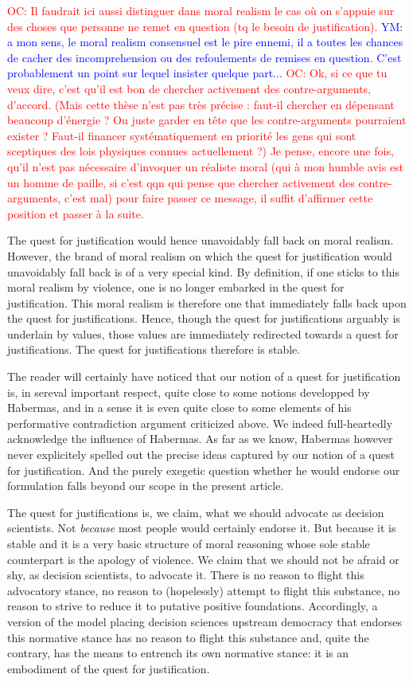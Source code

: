 \documentclass[preprint, french, english, 11pt]{elsarticle}%
\newcommand{\commentYM}[1]{\textcolor{blue}{YM: #1}}
\newcommand{\commentOC}[1]{\textcolor{red}{OC: #1}}
\begin{document}
\commentOC{Il faudrait ici aussi distinguer
dans moral realism le cas où on s’appuie sur des choses que
personne ne remet en question (tq le besoin de
justification).}
\commentYM{a mon sens, le moral realism consensuel est le pire ennemi, il a toutes les chances de cacher des incomprehension ou des refoulements de remises en question. C'est probablement un point sur lequel insister quelque part...}
\commentOC{Ok, si ce que tu veux dire, c’est qu’il est bon de chercher activement des contre-arguments, d’accord. (Mais cette thèse n’est pas très précise : faut-il chercher en dépensant beaucoup d’énergie ? Ou juste garder en tête que les contre-arguments pourraient exister ? Faut-il financer systématiquement en priorité les gens qui sont sceptiques des lois physiques connues actuellement ?) Je pense, encore une fois, qu’il n’est pas nécessaire d’invoquer un réaliste moral (qui à mon humble avis est un homme de paille, si c’est qqn qui pense que chercher activement des contre-arguments, c’est mal) pour faire passer ce message, il suffit d’affirmer cette position et passer à la suite.}

The quest for justification would hence unavoidably fall back on moral realism. However, the brand of moral realism on which the quest for justification would unavoidably fall back is of a very special kind. By definition, if one sticks to this moral realism by violence, one is no longer embarked in the quest for justification. This moral realism is therefore one that immediately falls back upon the quest for justifications. Hence, though the quest for justifications arguably is underlain by values, those values are immediately redirected towards a quest for justifications. The quest for justifications therefore is stable.

The reader will certainly have noticed that our notion of a quest for justification is, in sereval important respect, quite close to some notions developped by Habermas, and in a sense it is even quite close to some elements of his performative contradiction argument criticized above. We indeed full-heartedly acknowledge the influence of Habermas. As far as we know, Habermas however never explicitely spelled out the precise ideas captured by our notion of a quest for justification. And the purely exegetic question whether he would endorse our formulation falls beyond our scope in the present article. 

The quest for justifications is, we claim, what we should advocate as decision scientists. Not \emph{because} most people would certainly endorse it. But because it is stable and it is a very basic structure of moral reasoning whose sole stable counterpart is the apology of violence. We claim that we should not be afraid or shy, as decision scientists, to advocate it. There is no reason to flight this advocatory stance, no reason to (hopelessly) attempt to flight this substance, no reason to strive to reduce it to putative positive foundations. Accordingly, a version of the model placing decision sciences upstream democracy that endorses this normative stance has no reason to flight this substance and, quite the contrary, has the means to entrench its own normative stance: it is an embodiment of the quest for justification. 
\end{document}
